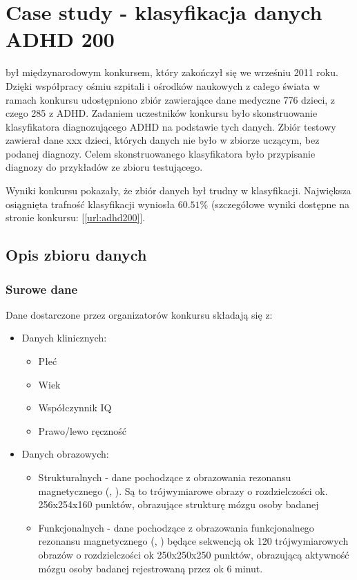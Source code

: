 \chapter{Case study - klasyfikacja danych ADHD 200}
 był międzynarodowym konkursem, który zakończył się we wrześniu 2011 roku. Dzięki współpracy ośmiu szpitali i ośrodków naukowych z całego świata w ramach konkursu udostępniono zbiór zawierające dane medyczne 776 dzieci, z czego 285 z ADHD. Zadaniem uczestników konkursu było skonstruowanie klasyfikatora diagnozującego ADHD na podstawie tych danych. Zbiór testowy zawierał dane xxx dzieci, których danych nie było w zbiorze uczącym, bez podanej diagnozy. Celem skonstruowanego klasyfikatora było przypisanie diagnozy do przykładów ze zbioru testującego.

Wyniki konkursu pokazały, że zbiór danych był trudny w klasyfikacji. Największa osiągnięta trafność klasyfikacji wyniosła $ 60.51 \% $ (szczegółowe wyniki dostępne na stronie konkursu: [\ref{url:adhd200}].
\section{Opis zbioru danych}
	\subsection{Surowe dane}
	Dane dostarczone przez organizatorów konkursu składają się z:
	\begin{itemize}
		\item Danych klinicznych:
			\begin{itemize}
				\item Płeć
				\item Wiek
				\item Współczynnik IQ
				\item Prawo/lewo ręczność
			\end{itemize}
		\item Danych obrazowych:
			\begin{itemize}
				\item Strukturalnych - dane pochodzące z obrazowania rezonansu magnetycznego (, ). Są to trójwymiarowe obrazy o rozdzielczości ok. 256x254x160 punktów, obrazujące strukturę mózgu osoby badanej
				\item Funkcjonalnych - dane pochodzące z obrazowania funkcjonalnego rezonansu magnetycznego (, ) będące sekwencją ok 120 trójwymiarowych obrazów o rozdzielczości ok 250x250x250 punktów, obrazującą aktywność mózgu osoby badanej rejestrowaną przez ok 6 minut.
			\end{itemize}
	\end{itemize}
